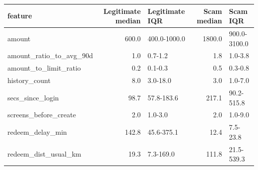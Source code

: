 \begin{tabular}{lrlrl}
\toprule
feature & Legitimate median & Legitimate IQR & Scam median & Scam IQR \\
\midrule
amount & 600.0 & 400.0-1000.0 & 1800.0 & 900.0-3100.0 \\
amount_ratio_to_avg_90d & 1.0 & 0.7-1.2 & 1.8 & 1.0-3.8 \\
amount_to_limit_ratio & 0.2 & 0.1-0.3 & 0.5 & 0.3-0.8 \\
history_count & 8.0 & 3.0-18.0 & 3.0 & 1.0-7.0 \\
secs_since_login & 98.7 & 57.8-183.6 & 217.1 & 90.2-515.8 \\
screens_before_create & 2.0 & 1.0-3.0 & 2.0 & 1.0-9.0 \\
redeem_delay_min & 142.8 & 45.6-375.1 & 12.4 & 7.5-23.8 \\
redeem_dist_usual_km & 19.3 & 7.3-169.0 & 111.8 & 21.5-539.3 \\
\bottomrule
\end{tabular}
